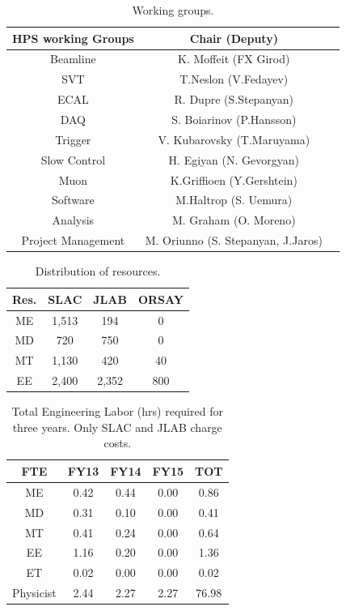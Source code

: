 \begin{table}[htdp]
\caption{Working groups.}
\begin{center}
\begin{tabular}{|c|c|c|}
\hline
HPS working Groups	& Chair (Deputy)\\
\hline\hline
Beamline	&K. Moffeit (FX Girod)\\
\hline
SVT	&T.Neslon (V.Fedayev)\\
\hline
ECAL	& R. Dupre (S.Stepanyan)\\
\hline
DAQ	 & S. Boiarinov (P.Hansson)\\
\hline
Trigger &	V. Kubarovsky (T.Maruyama)\\
\hline
Slow Control	& H. Egiyan (N. Gevorgyan)\\
\hline
Muon &	K.Griffioen (Y.Gershtein)\\
\hline
Software	& M.Haltrop (S. Uemura)\\
\hline
Analysis &	M. Graham (O. Moreno)\\
\hline
Project Management &	M. Oriunno (S. Stepanyan, J.Jaros)\\
\hline
\end{tabular}
\end{center}
\label{tb:groups}
\end{table}%

\begin{table}[htdp]
\caption{Distribution of resources.}
\begin{center}
\begin{tabular}{c|ccc}
Res.	 &SLAC	&JLAB	&ORSAY\\
\hline\hline
ME	&1,513	&194	&0 \\
MD	&720	&750	&0\\
MT	&1,130	&420	&40\\
EE 	&2,400	&2,352&	800\\
\end{tabular}
\end{center}
\label{tb:resources}
\end{table}%

\begin{table}[htdp]
\caption{Total Engineering Labor (hrs) required for three years. Only SLAC and JLAB charge costs.}
\begin{center}
\begin{tabular}{c|cccc}
 FTE	&FY13	&FY14	&FY15&	TOT\\
 \hline\hline
ME	&0.42	&0.44&	0.00&	0.86\\
MD&	0.31	&0.10&	0.00&	0.41\\
MT&	0.41	&0.24&	0.00	&0.64\\
EE &	1.16	&0.20&	0.00	&1.36\\
ET&	0.02	&0.00&	0.00	&0.02\\
Physicist	&2.44	&2.27	&2.27	&76.98\\
\end{tabular}
\end{center}
\label{tb:engin}
\end{table}%

